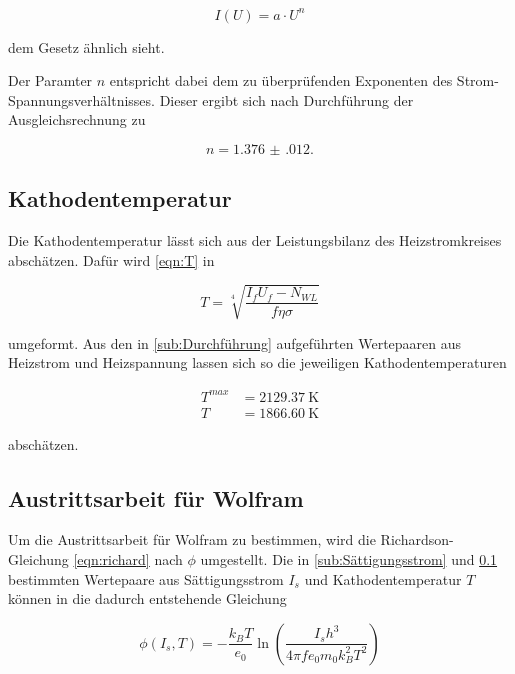\begin{equation}
    I(U)=a\cdot U^n
\end{equation}

dem Gesetz ähnlich sieht.

Der Paramter $n$ entspricht dabei dem zu überprüfenden Exponenten des Strom-Spannungsverhältnisses.
Dieser ergibt sich nach Durchführung der Ausgleichsrechnung zu 

\begin{equation*}
    n=\num{1.376(012)}.
\end{equation*}



\subsection{Kathodentemperatur}
\label{sub:Kathodentemperatur}

Die Kathodentemperatur lässt sich aus der Leistungsbilanz des Heizstromkreises abschätzen. Dafür wird \eqref{eqn:T} in

\begin{equation}
    T=\sqrt[4]{\frac{I_fU_f-N_{WL}}{f\eta \sigma}}
\end{equation}

umgeformt. Aus den in \ref{sub:Durchführung} aufgeführten Wertepaaren aus Heizstrom und Heizspannung lassen sich so die jeweiligen Kathodentemperaturen

\begin{align*}
T^{max}&=\SI{2129.37}{\kelvin} \\
T&=\SI{1866.60}{\kelvin}
\end{align*}

abschätzen.


\subsection{Austrittsarbeit für Wolfram}

Um die Austrittsarbeit für Wolfram zu bestimmen, wird die Richardson-Gleichung \eqref{eqn:richard} nach $\phi$ umgestellt.
Die in \ref{sub:Sättigungsstrom} und  \ref{sub:Kathodentemperatur} bestimmten Wertepaare aus Sättigungsstrom $I_s$ und Kathodentemperatur $T$ können in die dadurch entstehende Gleichung

\begin{equation}
    \phi(I_s,T)=-\frac{k_BT}{e_0}\ln\left(\frac{I_sh^3}{4\pi f e_0 m_0 k_B^2 T^2}\right)
\end{equation} 

